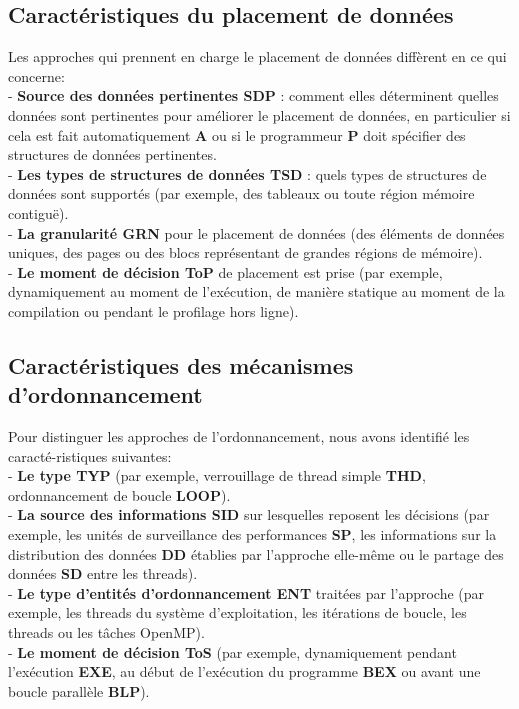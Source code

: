 \subsection{Caractéristiques du placement de données}
Les approches qui prennent en charge le placement de données diffèrent en ce qui concerne: \\
- \textbf{Source des données pertinentes SDP} : comment elles déterminent quelles données sont pertinentes pour améliorer le placement de données, en particulier si cela est fait automatiquement \textbf{A} ou si le programmeur \textbf{P} doit spécifier des structures de données pertinentes. \\
- \textbf{Les types de structures de données TSD} : quels types de structures de données sont supportés (par exemple, des tableaux ou toute région mémoire contiguë). \\
- \textbf{La granularité GRN} pour le placement de données (des éléments de données uniques, des pages ou des blocs représentant de grandes régions de mémoire). \\
- \textbf{Le moment de décision ToP} de placement est prise (par exemple, dynamiquement au moment de l'exécution, de manière statique au moment de la compilation ou pendant le profilage hors ligne). \\
%
\subsection{Caractéristiques des mécanismes d'ordonnancement}
Pour distinguer les approches de l'ordonnancement, nous avons identifié les caracté-ristiques suivantes: \\
- \textbf{Le type TYP} (par exemple, verrouillage de thread simple \textbf{THD}, ordonnancement de boucle \textbf{LOOP}). \\
- \textbf{La source des informations SID} sur lesquelles reposent les décisions (par exemple, les unités de surveillance des performances \textbf{SP}, les informations sur la distribution des données \textbf{DD} établies par l'approche elle-même ou le partage des données \textbf{SD} entre les threads).\\ 
- \textbf{Le type d'entités d'ordonnancement ENT} traitées par l'approche (par exemple, les threads du système d'exploitation, les itérations de boucle, les threads ou les tâches OpenMP). \\
- \textbf{Le moment de décision ToS} (par exemple, dynamiquement pendant l'exécution \textbf{EXE}, au début de l'exécution du programme \textbf{BEX} ou avant une boucle parallèle \textbf{BLP}).  
